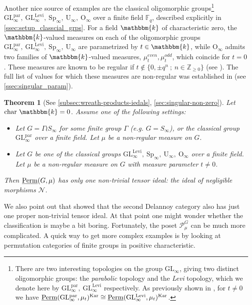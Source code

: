 \documentclass[11pt,a4paper]{amsart}
\theoremstyle{plain}%
\newtheorem{introtheorem}{Theorem}
\theoremstyle{definition}
\theoremstyle{remark}
\newcommand{\Z}{{\mathbb Z}}
\newcommand{\Perm}{\underline{{\rm Perm}}}
\newcommand{\kk}{\mathbbm{k}}
\newcommand{\Kar}{\mathrm{Kar}}
\begin{document}
Another nice source of examples are the classical oligomorphic groups\footnote{There are two interesting topologies on the group $\mathrm{GL_{\infty}}$, giving two distinct oligomorphic groups: the \emph{parabolic} topology and the \emph{Levi} topology, which we denote here by $\mathrm{GL^{par}_{\infty},~GL^{Levi}_{\infty}}$ respectively. As previously shown in \cite{HS-classical}, for $t\neq 0$ we have $\Perm(\mathrm{GL^{par}_{\infty}},\mu_t)^{\Kar}\cong \Perm(\mathrm{GL^{Levi}_{\infty}},\mu_t)^{\Kar}$.} $\mathrm{GL^{par}_{\infty},~GL^{Levi}_{\infty}, ~Sp_{\infty},~ U_{\infty},~ O_{\infty}}$ over a finite field $\mathbb{F}_q$, described explicitly in \cref{ssec:setup_classcial_grps}. For a field $\kk$ of characteristic zero, the $\kk$-valued measures on each of the oligomorphic groups $\mathrm{GL^{par}_{\infty},~GL^{Levi}_{\infty}, ~Sp_{\infty},~ U_{\infty}}$ are parametrized by $t\in \kk$, while $\mathrm{O_{\infty}}$ admits two families of $\kk$-valued measures, $\mu^{even}_t, \mu^{odd}_t$, which coincide for $t=0$. These measures are known to be regular if $t\notin \{0, \pm q^n~;~ n\in \Z_{\geq 0}\}$ (see \cite{HS-classical}). The full list of values for which these measures are non-regular was established in \cite{HS-classical} (see \cref{ssec:singular_param}).

\begin{introtheorem}[See \cref{subsec:wreath-products-iedals}, \cref{sec:singular-non-zero}]\label{introthm:boring} 
Let $\mathrm{char}~\kk = 0 $. Assume one of the following settings:
\begin{itemize}
    \item Let $G = \Gamma \wr S_{\infty}$ for some finite group $\Gamma$ (e.g. $G=S_{\infty}$), or the classical group $\mathrm{GL^{par}_{\infty}}$ over a finite field. Let $\mu$ be a non-regular measure on $G$. 
    
    \item Let $G$ be one of the classical groups $\mathrm{GL^{Levi}_{\infty}, ~Sp_{\infty},~ U_{\infty},~ O_{\infty}}$ over a finite field. {Let} $\mu$ be a non-regular measure on $G$ with measure parameter $t\neq 0$.
\end{itemize}
 Then $\Perm(G,\mu)$ has only one non-trivial tensor ideal: the ideal of negligible morphisms $\mathcal{N}$.

\end{introtheorem}

We also point out that \cite{CS-delannoy} showed that the second Delannoy category also has just one proper non-trivial tensor ideal. At that point one might wonder whether the classification is maybe a bit boring. Fortunately, the poset $\mathcal{P}_{\mu}^G$ can be much more complicated. A quick way to get more complex examples is by looking at permutation categories of finite groups in positive characteristic.
\end{document}
